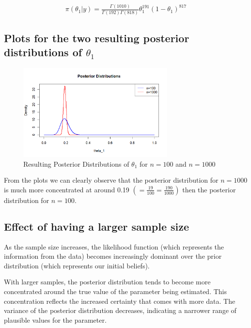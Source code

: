 \documentclass[a4paper]{article}
\begin{document}
\begin{align*}
    \pi(\theta_1|y) = \frac{\Gamma(1010)}{\Gamma(192)\Gamma(818)}\theta_1^{191}(1-\theta_1)^{817}
\end{align*}

\subsection*{Plots for the two resulting posterior distributions of \(\theta_1\)}
\begin{figure}[htbp] %
    \centering
    \includegraphics[width=0.7\textwidth]{Posterior_Distribution.png}
    \caption{Resulting Posterior Distributions of \(\theta_1\) for \(n = 100\) and \(n = 1000\)}
    \label{fig:myimage}
\end{figure}

From the plots we can clearly observe that the posterior distribution for \(n = 1000\) is much more concentrated at around 0.19 \( \left(= \frac{19}{100} = \frac{190}{1000}\right)\) then the posterior distribution for \(n=100\).

\subsection*{Effect of having a larger sample size}
As the sample size increases, the likelihood function (which represents the information from the data) becomes increasingly dominant over the prior distribution (which represents our initial beliefs).

With larger samples, the posterior distribution tends to become more concentrated around the true value of the parameter being estimated.
This concentration reflects the increased certainty that comes with more data.
The variance of the posterior distribution decreases, indicating a narrower range of plausible values for the parameter.


\newpage
\end{document}
